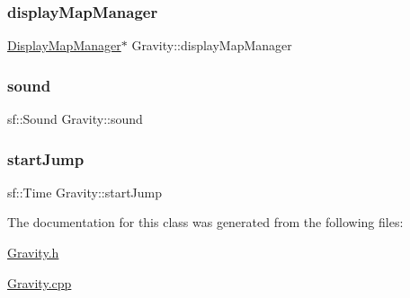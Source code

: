 \mbox{\label{class_gravity_a72a7e04f7555e0f29d100c965ff5080f}} 
\subsubsection{\texorpdfstring{display\+Map\+Manager}{displayMapManager}}
{\footnotesize\ttfamily \hyperlink{class_display_map_manager}{Display\+Map\+Manager}$\ast$ Gravity\+::display\+Map\+Manager\hspace{0.3cm}{\ttfamily [protected]}}

\mbox{\label{class_gravity_a5d636ab38b930cff4d585bfd374479b6}} 
\subsubsection{\texorpdfstring{sound}{sound}}
{\footnotesize\ttfamily sf\+::\+Sound Gravity\+::sound}

\mbox{\label{class_gravity_a9284458ed2208a9df9ea8f1bf1b6c36a}} 
\subsubsection{\texorpdfstring{start\+Jump}{startJump}}
{\footnotesize\ttfamily sf\+::\+Time Gravity\+::start\+Jump\hspace{0.3cm}{\ttfamily [protected]}}



The documentation for this class was generated from the following files\+:\begin{DoxyCompactItemize}
\item 
\hyperlink{_gravity_8h}{Gravity.\+h}\item 
\hyperlink{_gravity_8cpp}{Gravity.\+cpp}\end{DoxyCompactItemize}
